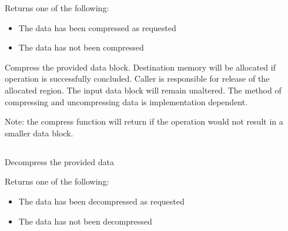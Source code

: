 Returns one of the following:
\begin{itemize}
\item {} The data has been compressed as requested
\item {} The data has not been compressed
\end{itemize}

\descr

Compress the provided data block. Destination memory
will be allocated if operation is successfully concluded. Caller
is responsible for release of the allocated region. The input
data block will remain unaltered.
The method of compressing and uncompressing data is implementation dependent.

Note: the compress function will return  if the operation
would not result in a smaller data block.



\subsection{}

\summary

Decompress the provided data

\format


\begin{arglist}
\end{arglist}

Returns one of the following:
\begin{itemize}
\item {} The data has been decompressed as requested
\item {} The data has not been decompressed
\end{itemize}

